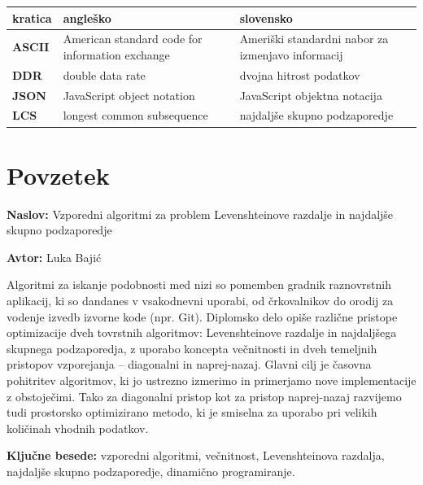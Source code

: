 \documentclass[a4paper,12pt,openright]{book}
\newcommand{\ttitle}{Vzporedni algoritmi za problem Levenshteinove razdalje in najdaljše skupno podzaporedje}
\newcommand{\tauthor}{Luka Bajić}
\newcommand{\tkeywords}{vzporedni algoritmi, večnitnost, Levenshteinova razdalja, najdaljše skupno podzaporedje, dinamično programiranje}
\newcommand{\clearemptydoublepage}{\newpage{\pagestyle{empty}\cleardoublepage}}
\begin{document}
\noindent\begin{tabular}{p{}|p{}|p{}}    %
  {\bf kratica} & {\bf angleško}                              & {\bf slovensko} \\ \hline
  {\bf ASCII} & American standard code for information exchange & Ameriški standardni nabor za izmenjavo informacij \\
  {\bf DDR} & double data rate & dvojna hitrost podatkov \\
  {\bf JSON} & JavaScript object notation & JavaScript objektna notacija \\
  {\bf LCS} & longest common subsequence & najdaljše skupno podzaporedje \\
  
\end{tabular}

\clearemptydoublepage

{}
\chapter*{Povzetek}

\noindent\textbf{Naslov:} \ttitle
\bigskip

\noindent\textbf{Avtor:} \tauthor
\bigskip

\noindent Algoritmi za iskanje podobnosti med nizi so pomemben gradnik raznovrstnih aplikacij, ki so dandanes v vsakodnevni uporabi, od črkovalnikov do orodij za vodenje izvedb izvorne kode (npr. Git). Diplomsko delo opiše različne pristope optimizacije dveh tovrstnih algoritmov: Levenshteinove razdalje in najdaljšega skupnega podzaporedja, z uporabo koncepta večnitnosti in dveh temeljnih pristopov vzporejanja -- diagonalni in naprej-nazaj. Glavni cilj je časovna pohitritev algoritmov, ki jo ustrezno izmerimo in primerjamo nove implementacije z obstoječimi. Tako za diagonalni pristop kot za pristop naprej-nazaj razvijemo tudi prostorsko optimizirano metodo, ki je smiselna za uporabo pri velikih količinah vhodnih podatkov. 

\bigskip

\noindent\textbf{Ključne besede:} \tkeywords.
\clearemptydoublepage

{}
\end{document}
